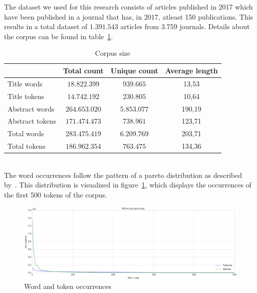 \documentclass[../../Thesis.tex]{subfiles}
\begin{document}
The dataset we used for this research consists of articles published in 2017 which have been published in a journal that has, in 2017, atleast 150 publications. This results in a total dataset of $1.391.543$ articles from $3.759$ journals. Details about the corpus can be found in table~\ref{table:corpusSize}.
\begin{table}[hbt]
\begin{center}
\begin{tabular}{|l|c|c|c|}
\hline
 & Total count & Unique count & Average length \\
\hline\hline
Title words & $18.822.399$ & $939.665$ & 13,53  \\
\hline
Title tokens & $14.742.192$ & $230.805$ & 10,64 \\
\hline\hline
Abstract words & $264.653.020$ & $5.853.077$  & 190,19  \\
\hline
Abstract tokens & $171.474.473$ & $738.961$ & 123,71 \\
\hline\hline
Total words & $283.475.419$ & $6.209.769$  & 203,71 \\
\hline
Total tokens & $186.962.354$ & $763.475$ & 134,36 \\
\hline
\end{tabular}
\end{center}
\caption{Corpus size}\label{table:corpusSize}
\end{table}\\
The word occurrences follow the pattern of a pareto distribution as described by~\citet{wiegand2018word}. This distribution is visualized in figure~\ref{figure:wordTokenOccurrence}, which displays the occurrences of the first 500 tokens of the corpus.
\begin{figure}[hbt]
\includegraphics[width=6.5in]{Plots/word_occurrences}
\caption{Word and token occurrences}\label{figure:wordTokenOccurrence}
\end{figure}
\end{document}
